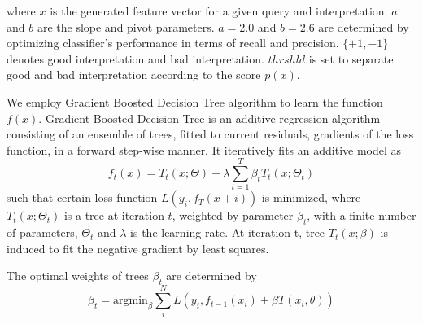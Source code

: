 \documentclass{acm_proc_article-sp}
\begin{document}
where $x$ is the generated feature vector for a given query and interpretation. $a$ and $b$ are the slope and pivot parameters. $a=2.0$ and $b=2.6$ are determined by optimizing classifier's performance in terms of recall and precision. $\{+1,-1\}$ denotes good interpretation and bad interpretation. $thrshld$ is set to separate good and bad interpretation according to the score $p(x)$. 

We employ Gradient Boosted Decision Tree algorithm 
to learn the function $f(x)$. Gradient Boosted Decision Tree is an
additive regression algorithm consisting of an ensemble of trees,
fitted to current residuals, gradients of the loss function, in a
forward step-wise manner. It iteratively fits an additive model as
$$
f_t(x) = T_t(x; \Theta) + \lambda \sum_{t=1}^T \beta_t T_t(x; \Theta_t)
$$
\noindent such that certain loss function $L(y_i, f_T (x + i))$ is
minimized, where $T_t(x;\Theta_t)$ is a tree at iteration $t$,
weighted by parameter $\beta_t$, with a finite number of parameters,
$\Theta_t$ and $\lambda$ is the learning rate. At iteration t, tree
$T_t(x; \beta)$ is induced to fit the negative gradient by least
squares.


\noindent The optimal weights of trees $\beta_t$ are determined by
$$
\beta_t = \text{argmin} _{\beta} \sum_i^N L(y_i, f_{t-1}(x_i) + \beta T(x_i, \theta))
$$
\end{document}
